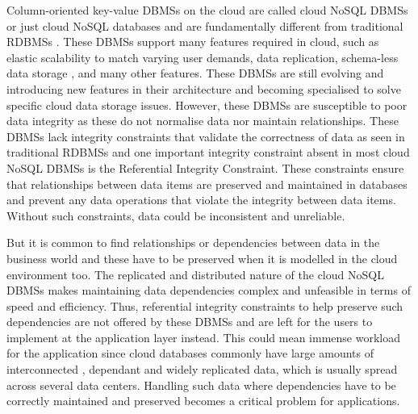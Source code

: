 Column-oriented key-value \acp{DBMS} on the cloud are called cloud
\ac{NoSQL}  \acp{DBMS}  or just cloud \ac{NoSQL}  databases and are fundamentally
different from  traditional \acp{RDBMS} . These \acp{DBMS}  support many features
required in cloud,  such as elastic scalability to match varying user
demands, data replication,  schema-less data storage ,   and many other features. 
These \acp{DBMS}  are still evolving and introducing new features in their
architecture and becoming specialised to solve specific cloud data storage
issues.  However,  these \acp{DBMS}  are susceptible to poor data integrity as
these do not normalise data nor maintain relationships.  These \acp{DBMS}  lack
integrity constraints that validate the correctness of data as seen in
traditional \acp{RDBMS}  and one  important integrity constraint absent in most
cloud \ac{NoSQL}  \acp{DBMS}  is the Referential Integrity Constraint.  These
constraints  ensure that relationships between data items are preserved
and maintained in databases and prevent any data operations that violate the
integrity between data items. Without such constraints,  data could be inconsistent and unreliable. 

% 


 But it is common to find relationships or dependencies between data in the
 business world and these have to be preserved when it is modelled in the cloud
 environment too. 
The replicated and distributed nature of the cloud \ac{NoSQL}  \acp{DBMS}  makes
maintaining data dependencies complex and unfeasible in terms of speed and efficiency. 
Thus,  referential integrity constraints to help preserve such dependencies are
not offered by these \acp{DBMS}  and are left for the users to implement at the
application layer instead.  This could mean immense
workload for the application since cloud databases commonly have
 large amounts of interconnected ,  dependant and
widely replicated data,  which is usually spread across several data centers. 
Handling such data where
dependencies have to be correctly maintained and preserved becomes a critical
problem for applications. 

